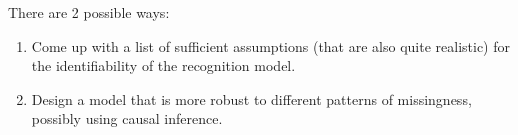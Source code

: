 \documentclass[a4paper,12pt,twoside,openright]{report}
\begin{document}
There are 2 possible ways:

\begin{enumerate}
    \item Come up with a list of sufficient assumptions (that are also quite realistic) for the identifiability of the recognition model.
    \item Design a model that is more robust to different patterns of missingness, possibly using causal inference.
\end{enumerate}



%

\cleardoublepage
{}
{}
% 
\printbibliography



\end{document}
